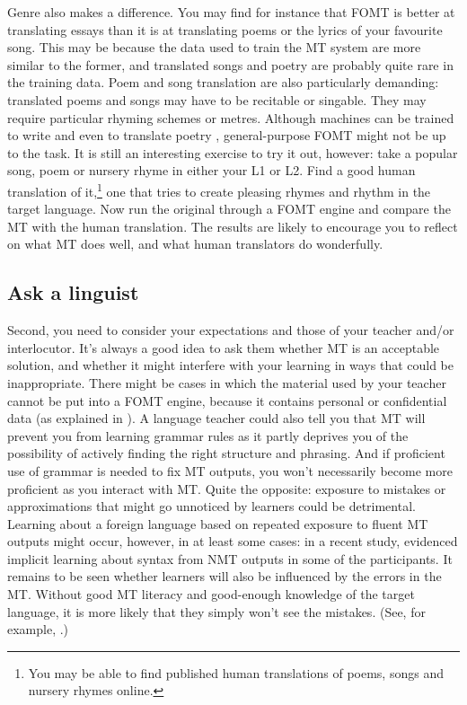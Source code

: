 \documentclass[output=paper,colorlinks,citecolor=brown,
]{langscibook}
\begin{document}
Genre also makes a difference. You may find for instance that FOMT is better at translating essays than it is at translating poems or the lyrics of your favourite song. This may be because the data used to train the MT system are more similar to the former, and translated songs and poetry are probably quite rare in the training data. Poem and song translation are also particularly demanding: translated poems and songs may have to be recitable or singable. They may require particular rhyming schemes or metres. Although machines can be trained to write and even to translate poetry \citep{VandeCruys2018, VandeCruys2019, VandeCruys2020}, general-purpose FOMT might not be up to the task. It is still an interesting exercise to try it out, however: take a popular song, poem or nursery rhyme in either your L1 or L2. Find a good human translation of it,\footnote{You may be able to find published human translations of poems, songs and nursery rhymes online.} one that tries to create pleasing rhymes and rhythm in the target language. Now run the original through a FOMT engine and compare the MT with the human translation. The results are likely to encourage you to reflect on what MT does well, and what human translators do wonderfully.

\subsection{Ask a linguist}

Second, you need to consider your expectations and those of your teacher and/or interlocutor. It’s always a good idea to ask them whether MT is an acceptable solution, and whether it might interfere with your learning in ways that could be inappropriate. There might be cases in which the material used by your teacher cannot be put into a FOMT engine, because it contains personal or confidential data (as explained in ). A language teacher could also tell you that MT will prevent you from learning grammar rules as it partly deprives you of the possibility of actively finding the right structure and phrasing. And if proficient use of grammar is needed to fix MT outputs, you won’t necessarily become more proficient as you interact with MT. Quite the opposite: exposure to mistakes or approximations that might go unnoticed by learners could be detrimental. Learning about a foreign language based on repeated exposure to fluent MT outputs might occur, however, in at least some cases: in a recent study, \citet{ResendeWay2021} evidenced implicit learning about syntax from NMT outputs in some of the participants. It remains to be seen whether learners will also be influenced by the errors in the MT. Without good MT literacy and good-enough knowledge of the target language, it is more likely that they simply won’t see the mistakes. (See, for example, \citealt{LoockLéchauguette2021}.)
\end{document}
